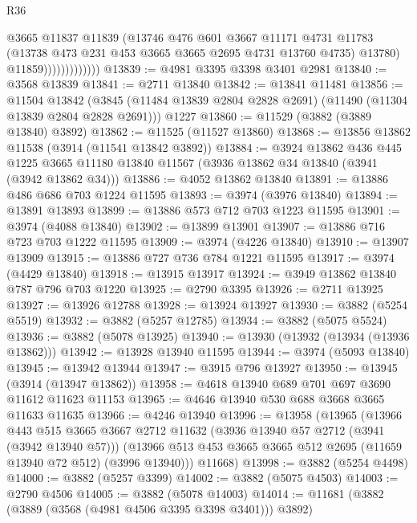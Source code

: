 \begin{lexlean}{R36}
\begin{coremodule}
                              @3665
                              @11837
                              @11839
                              (@13746
                                @476
                                @601
                                @3667
                                @11171
                                @4731
                                @11783
                                (@13738 @473 @231 @453 @3665 @3665 @2695 @4731 @13760 @4735)
                                @13780)
                              @11859)))))))))))))
@13839 := @4981 @3395 @3398 @3401 @2981
@13840 := @3568 @13839
@13841 := @2711 @13840
@13842 := @13841 @11481
@13856 := @11504
    @13842
    (@3845 (@11484 @13839 @2804 @2828 @2691) (@11490 (@11304 @13839 @2804 @2828 @2691)))
    @1227
@13860 := @11529 (@3882 (@3889 @13840) @3892)
@13862 := @11525 (@11527 @13860)
@13868 := @13856 @13862 @11538 (@3914 (@11541 @13842 @3892))
@13884 := @3924
    @13862
    @436
    @445
    @1225
    @3665
    @11180
    @13840
    @11567
    (@3936 @13862 @34 @13840 (@3941 (@3942 @13862 @34)))
@13886 := @4052 @13862 @13840
@13891 := @13886 @486 @686 @703 @1224 @11595
@13893 := @3974 (@3976 @13840)
@13894 := @13891 @13893
@13899 := @13886 @573 @712 @703 @1223 @11595
@13901 := @3974 (@4088 @13840)
@13902 := @13899 @13901
@13907 := @13886 @716 @723 @703 @1222 @11595
@13909 := @3974 (@4226 @13840)
@13910 := @13907 @13909
@13915 := @13886 @727 @736 @784 @1221 @11595
@13917 := @3974 (@4429 @13840)
@13918 := @13915 @13917
@13924 := @3949 @13862 @13840 @787 @796 @703 @1220
@13925 := @2790 @3395
@13926 := @2711 @13925
@13927 := @13926 @12788
@13928 := @13924 @13927
@13930 := @3882 (@5254 @5519)
@13932 := @3882 (@5257 @12785)
@13934 := @3882 (@5075 @5524)
@13936 := @3882 (@5078 @13925)
@13940 := @13930 (@13932 (@13934 (@13936 @13862)))
@13942 := @13928 @13940 @11595
@13944 := @3974 (@5093 @13840)
@13945 := @13942 @13944
@13947 := @3915 @796 @13927
@13950 := @13945 (@3914 (@13947 @13862))
@13958 := @4618 @13940 @689 @701 @697 @3690 @11612 @11623 @11153
@13965 := @4646 @13940 @530 @688 @3668 @3665 @11633 @11635
@13966 := @4246 @13940
@13996 := @13958
    (@13965
      (@13966
        @443
        @515
        @3665
        @3667
        @2712
        @11632
        (@3936 @13940 @57 @2712 (@3941 (@3942 @13940 @57)))
        (@13966 @513 @453 @3665 @3665 @512 @2695 (@11659 @13940 @72 @512) (@3996 @13940)))
      @11668)
@13998 := @3882 (@5254 @4498)
@14000 := @3882 (@5257 @3399)
@14002 := @3882 (@5075 @4503)
@14003 := @2790 @4506
@14005 := @3882 (@5078 @14003)
@14014 := @11681 (@3882 (@3889 (@3568 (@4981 @4506 @3395 @3398 @3401))) @3892)

\end{coremodule}
\end{lexlean}
